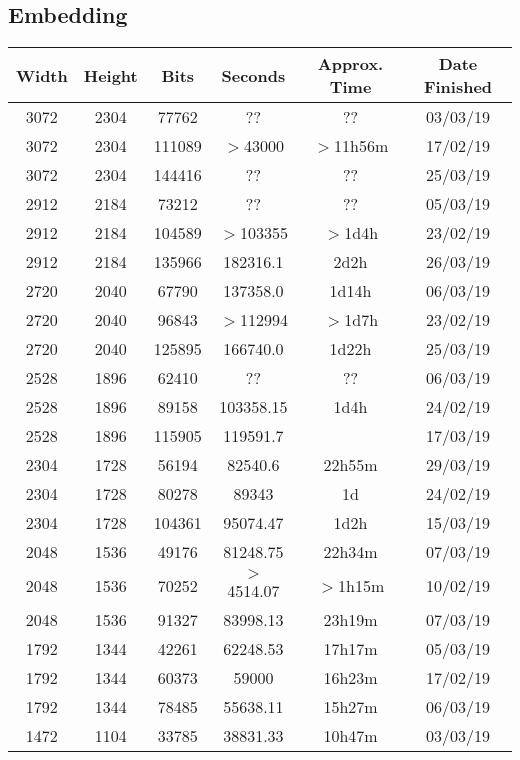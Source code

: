 \subsection{Embedding}
  \begin{center}
  \begin{tabular}{ c c c | c c c }
  Width & Height & Bits & Seconds & Approx. Time & Date Finished \\ \hline
  3072 & 2304 & 77762 & ?? & ?? & 03/03/19 \\ %
  3072 & 2304 & 111089 & $>$43000 & $>$11h56m & 17/02/19 \\
  3072 & 2304 & 144416 & ?? & ?? & 25/03/19 \\ %
  2912 & 2184 & 73212 & ?? & ?? & 05/03/19 \\ %
  2912 & 2184 & 104589 & $>$103355 & $>$1d4h & 23/02/19 \\
  2912 & 2184 & 135966 & 182316.1 & 2d2h & 26/03/19 \\
  2720 & 2040 & 67790 & 137358.0 & 1d14h & 06/03/19 \\
  2720 & 2040 & 96843 & $>$112994 & $>$1d7h & 23/02/19 \\
  2720 & 2040 & 125895 & 166740.0 & 1d22h & 25/03/19 \\
  2528 & 1896 & 62410 & ?? & ?? & 06/03/19 \\ %
  2528 & 1896 & 89158 & 103358.15 & 1d4h & 24/02/19 \\
  2528 & 1896 & 115905 & 119591.7 &  & 17/03/19 \\ %
  2304 & 1728 & 56194 & 82540.6 & 22h55m & 29/03/19 \\
  2304 & 1728 & 80278 & 89343 & 1d & 24/02/19 \\
  2304 & 1728 & 104361 & 95074.47 & 1d2h & 15/03/19 \\
  2048 & 1536 & 49176 & 81248.75 & 22h34m & 07/03/19 \\
  2048 & 1536 & 70252 & $>$4514.07 & $>$1h15m & 10/02/19 \\
  2048 & 1536 & 91327 & 83998.13 & 23h19m & 07/03/19 \\
  1792 & 1344 & 42261 & 62248.53 & 17h17m & 05/03/19 \\
  1792 & 1344 & 60373 & 59000 & 16h23m & 17/02/19 \\
  1792 & 1344 & 78485 & 55638.11 & 15h27m & 06/03/19 \\
  1472 & 1104 & 33785 & 38831.33 & 10h47m & 03/03/19 \\

\end{tabular}
\end{center}
